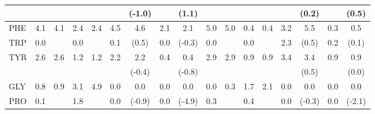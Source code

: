 \begin{table}
{\begin{tabular}{lcccc|cccc|cccc|cccc}
&&&&&&(-1.0)&&(1.1)&&&&&&(0.2)&&(0.5)\\
\hline                                                         
PHE      &4.1&\multirow{2}{*}{4.1}&2.4&\multirow{2}{*}{2.4}&4.5&\multirow{1}{*}{4.6}&2.1&\multirow{1}{*}{2.1}&5.0&\multirow{2}{*}{5.0}&0.4&\multirow{2}{*}{0.4}&3.2&\multirow{1}{*}{5.5}&0.3&\multirow{1}{*}{0.5}\\
TRP&0.0&&0.0&&0.1&(0.5)&0.0&(-0.3)&0.0&&0.0&&2.3&(0.5)&0.2&(0.1)\\
\hline                                                                                                                                                                                   
\multirow{2}{*}{TYR}&\multirow{2}{*}{2.6}&\multirow{2}{*}{2.6}&\multirow{2}{*}{1.2}&\multirow{2}{*}{1.2}&\multirow{2}{*}{2.2}&2.2&\multirow{2}{*}{0.4}&0.4&\multirow{2}{*}{2.9}&\multirow{2}{*}{2.9}&\multirow{2}{*}{0.9}&\multirow{2}{*}{0.9}&\multirow{2}{*}{3.4}&3.4&\multirow{2}{*}{0.9}&0.9\\
&&&&&&(-0.4)&&(-0.8)&&&&&&(0.5)&&(0.0)\\
\hline                                                                                                                                                                            
GLY&0.8&\multirow{2}{*}{0.9}&3.1&\multirow{2}{*}{4.9}&0.0&\multirow{1}{*}{0.0}&0.0&\multirow{1}{*}{0.0}&0.0&\multirow{2}{*}{0.3}&1.7&\multirow{2}{*}{2.1}&0.0&\multirow{1}{*}{0.0}&0.0&\multirow{1}{*}{0.0}\\
PRO&0.1&&1.8&&0.0&(-0.9)&0.0&(-4.9)&0.3&&0.4&&0.0&(-0.3)&0.0&(-2.1)\\
\hline
\end{tabular}
}
\end{table}

\clearpage


